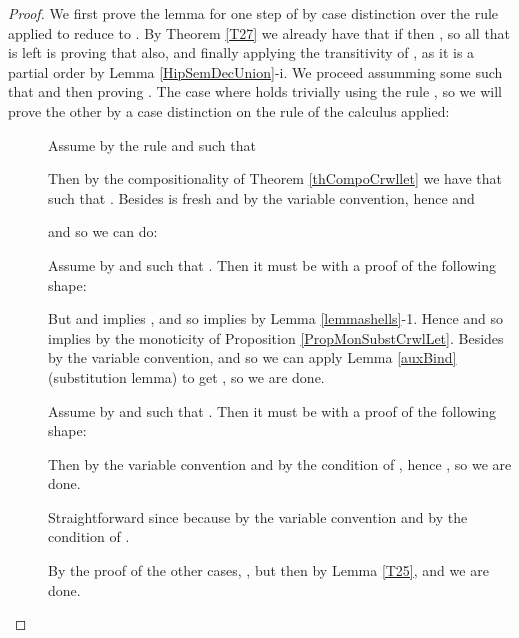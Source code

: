 \begin{proof}\label{DEMO_propFnfPreservHipSem}
We first prove the lemma for one step of  by case distinction over the rule applied to reduce  to . By Theorem \ref{T27} we already have that  if  then , so all that is left is proving that  also, and finally applying the transitivity of , as it is a partial order by Lemma \ref{HipSemDecUnion}-i. We proceed assumming some  such that  and then proving . The case where  holds trivially using the rule , so we will prove the other by a case distinction
on the rule of the  calculus applied:
\begin{description}

\item[] Assume  by the  rule and  such that 

Then by the compositionality of Theorem \ref{thCompoCrwllet} we have that  such that . Besides  is fresh and  by the variable convention, hence 
and

and so we can do:
\small{

}

\item[] Assume  by  and  such that . Then it must be with a proof of the following shape:

But  and  implies , and so  implies  by Lemma \ref{lemmashells}-1. Hence  and so  implies  by the monoticity of Proposition \ref{PropMonSubstCrwlLet}. Besides  by the variable convention, and so we can apply Lemma \ref{auxBind} (substitution lemma) to get , so we are done.

\item[] Assume  by  and  such that . Then it must be with a proof of the following shape:

Then  by the variable convention and  by the condition of , hence , so we are done.

\item[] Straightforward since  because  by the variable convention and  by the condition of .


 \item[] By the proof of the other cases, , but then  by Lemma \ref{T25}, and we are done.
\end{description}
\end{proof}














